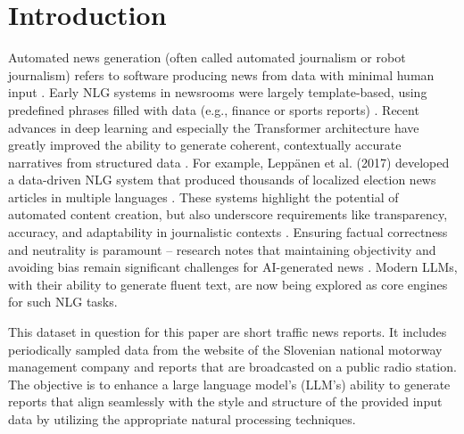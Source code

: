 \section*{Introduction}

Automated news generation (often called automated journalism or robot journalism) refers to software producing news from data with minimal human input \cite{acl_anthology}.
Early NLG systems in newsrooms were largely template-based, using predefined phrases filled with data (e.g., finance or sports reports) \cite{acl_anthology}.
Recent advances in deep learning and especially the Transformer architecture have greatly improved the ability to generate coherent, contextually accurate narratives from structured data \cite{arxiv_transformer}.
For example, Leppänen et al. (2017) developed a data-driven NLG system that produced thousands of localized election news articles in multiple languages \cite{acl_anthology}.
These systems highlight the potential of automated content creation, but also underscore requirements like transparency, accuracy, and adaptability in journalistic contexts \cite{acl_anthology}.
Ensuring factual correctness and neutrality is paramount – research notes that maintaining objectivity and avoiding bias remain significant challenges for AI-generated news \cite{arxiv_bias}.
Modern LLMs, with their ability to generate fluent text, are now being explored as core engines for such NLG tasks.

This dataset in question for this paper are short traffic news reports.
It includes periodically sampled data from the website of the Slovenian national motorway management company and reports that are broadcasted on a public radio station.
The objective is to enhance a large language model's (LLM's) ability to generate reports that align seamlessly with the style and structure of the provided input data by utilizing the appropriate natural processing techniques.

